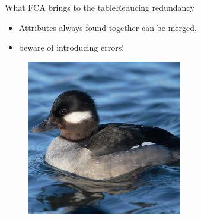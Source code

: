 \begin{frame}{What FCA brings to the table}{Reducing redundancy}
\begin{itemize}
\item Attributes always found together can be merged,
\item beware of introducing errors!
\end{itemize}
\begin{figure}[ht]
  \begin{minipage}[t]{0.3\linewidth}
    \vspace{0pt}
    \centering
    \includegraphics[width=\textwidth]{img/fca/duck1}
    \\ \color{green}{\footnotesize $hasBill(x) \wedge isDuck(x)$}
  \end{minipage}
  \hfill
  \begin{minipage}[t]{0.3\linewidth}
    \vspace{0pt}
    \centering

\end{minipage}
\end{figure}
\end{frame}
